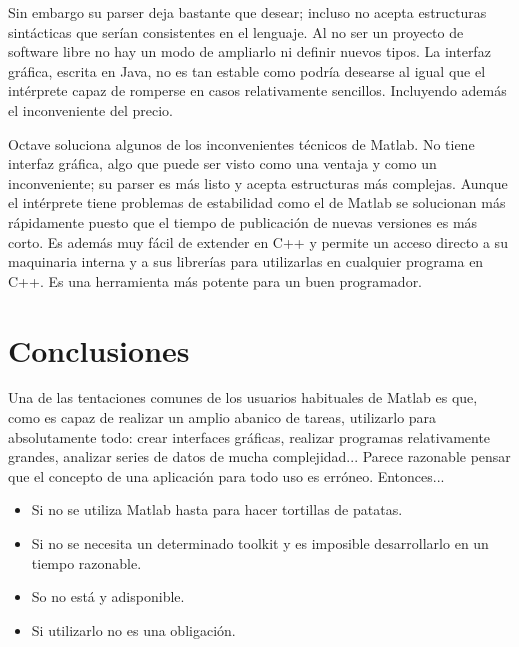 \documentclass[10pt,letterpaper,conference]{ieeeconfspanish}
\begin{document}
Sin embargo su parser deja bastante que desear; incluso no acepta
estructuras sintácticas que serían consistentes en el lenguaje.  Al no
ser un proyecto de software libre no hay un modo de ampliarlo ni
definir nuevos tipos.  La interfaz gráfica, escrita en Java, no es tan
estable como podría desearse al igual que el intérprete capaz de
romperse en casos relativamente sencillos.  Incluyendo además el
inconveniente del precio.

Octave soluciona algunos de los inconvenientes técnicos de Matlab.  No
tiene interfaz gráfica, algo que puede ser visto como una ventaja y
como un inconveniente; su parser es más listo y acepta estructuras más
complejas.  Aunque el intérprete tiene problemas de estabilidad como
el de Matlab se solucionan más rápidamente puesto que el tiempo de
publicación de nuevas versiones es más corto.  Es además muy fácil de
extender en C++ y permite un acceso directo a su maquinaria interna y
a sus librerías para utilizarlas en cualquier programa en C++.  Es una
herramienta más potente para un buen programador.



\hypertarget{conclusiones}{}
\section*{Conclusiones}

Una de las tentaciones comunes de los usuarios habituales de Matlab es
que, como es capaz de realizar un amplio abanico de tareas, utilizarlo
para absolutamente todo: crear interfaces gráficas, realizar programas
relativamente grandes, analizar series de datos de mucha
complejidad... Parece razonable pensar que el concepto de una
aplicación para todo uso es erróneo. Entonces...
\begin{itemize}
\item {} 
Si no se utiliza Matlab hasta para hacer tortillas de patatas.

\item {} 
Si no se necesita un determinado toolkit y es imposible
desarrollarlo en un tiempo razonable.

\item {} 
So no está y adisponible.

\item {} 
Si utilizarlo no es una obligación.

\end{itemize}
\end{document}
